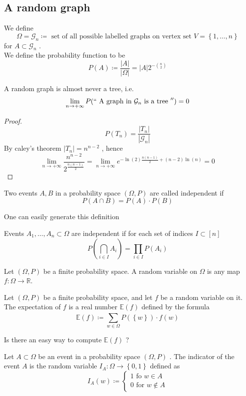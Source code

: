 \documentclass[../main.tex]{subfiles}
\begin{document}
\subsection{A random graph}
We define 
\[ 
\Omega= \mathcal{G}_n \coloneqq \text{ set of all possible labelled graphs on vertex set  } V = \left\{ 1, \ldots, n \right\} 
\]
for $A \subset \mathcal{G}_n$ .\\
We define the probability function to be
\[ 
	P( A)  \coloneqq \frac{|A|}{|\Omega|}= |A| 2^{- \binom n 2}
\]
\begin{propo}
A random graph is almost never a tree, i.e.
\[ 
	\lim_{n \to  + \infty} P( `` \text{ A graph in $\mathcal{G}_n$ is a tree } '' ) =0
\]

\end{propo}
\begin{proof}
\[ 
	P( T_n) = \frac{|T_n|}{| \mathcal{G}_n|}
\]
By caley's theorem $|T_n| = n^{n-2}$ , hence
\[ 
	\lim_{n \to  + \infty} \frac{n^{n-2}}{2^{ \frac{n ( n-1) }{2}}}= \lim_{n \to  + \infty} e^{- \ln( 2) \frac{n( n-1) }{2}+ ( n-2) \ln ( n) } =0
\]

\end{proof}
\begin{defn}
	Two events $A,B$ in a  probability space $(  \Omega, P) $ are called independent if
	\[ 
		P( A \cap B) = P( A) \cdot P( B) 
	\]
	
\end{defn}
One can easily generate this definition
\begin{defn}
	Events $A_1, \ldots, A_n \subset \Omega	$ are independent if for each set of indices $I \subset [ n] $ 
	\[ 
		P( \bigcap_{i \in I} A_i) = \prod_{i\in I} P( A_i) 		
	\]
	
	
\end{defn}
\begin{defn}
	Let $( \Omega, P) $ be a finite probability space. A random variable on $\Omega$ is any map $f: \Omega \to \mathbb{R}$.
\end{defn}
\begin{defn}
	Let $( \Omega, P) $ be a finite probability space, and let $f$ be a random variable on it.\\
	The expectation of $f$ is a real number $ \mathbb{E}( f) $ defined by the formula
	\[ 
		\mathbb{E}( f)  \coloneqq \sum_{w \in \Omega}^{ }P(  \left\{ w \right\} ) \cdot f( w) 
	\]
	
\end{defn}
Is there an easy way to compute $ \mathbb{E}( f) $ ?
\begin{defn}[Indicator]
	Let $A \subset \Omega$ be an event in a probability space $( \Omega, P) $ . The indicator of the event $A$ is the random variable $I_A : \Omega \to \left\{ 0,1 \right\} $ defined as
	\[ 
		I_A( w) \coloneqq  
		\begin{cases}
		1 \text{ fo } w \in A\\
		0 \text{ for } w \notin A
		\end{cases}
	\]
	
\end{defn}
\end{document}

